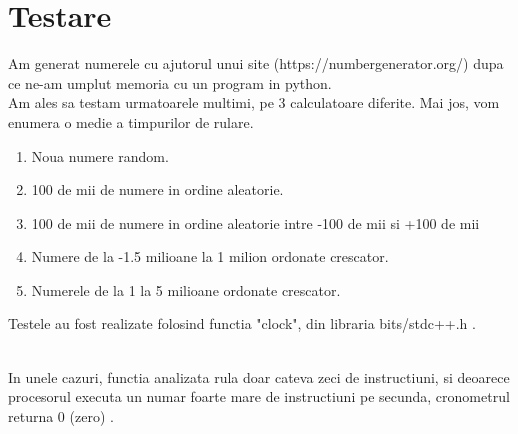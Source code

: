\documentclass[12pt]{article}
\begin{document}
\section{Testare}


Am generat numerele cu ajutorul unui site (https://numbergenerator.org/) dupa ce ne-am umplut memoria cu un program in python.\\
Am ales sa testam urmatoarele multimi, pe 3 calculatoare diferite. Mai jos, vom enumera o medie a timpurilor de rulare. \\
\begin{enumerate}
\setlength\itemsep{-1.2em}
\item Noua numere random.\\
\item 100 de mii de numere in ordine aleatorie.\\
\item 100 de mii de numere in ordine aleatorie intre -100 de mii si +100 de mii\\
\item Numere de la -1.5 milioane la 1 milion ordonate crescator.\\
\item Numerele de la 1 la 5 milioane ordonate crescator.\\
\end{enumerate}



\begin{center}
Testele au fost realizate folosind functia "clock", din libraria bits/stdc++.h .\\
\noindent{}\\
\end{center}
In unele cazuri, functia analizata rula doar cateva zeci de instructiuni, si deoarece procesorul executa un numar foarte mare de instructiuni pe secunda, cronometrul returna 0 (zero) .\\
\end{document}
